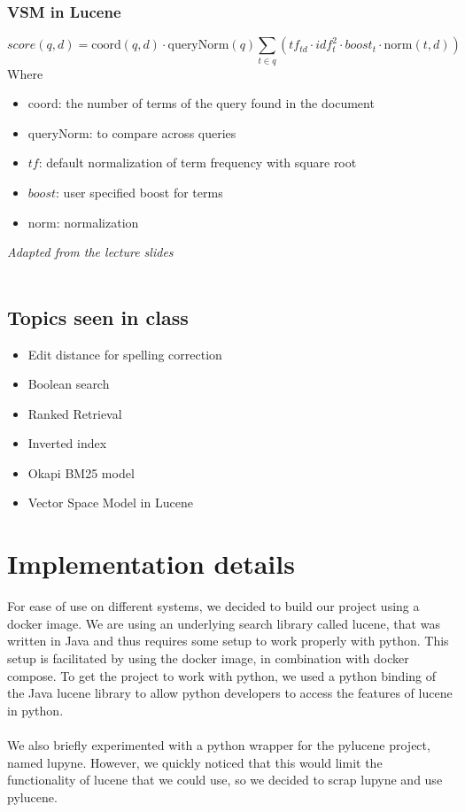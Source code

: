 \documentclass{article}
\begin{document}
\subsubsection{VSM in Lucene}
$$score(q,d) = \text{coord}(q,d) \cdot \text{queryNorm}(q) \displaystyle \sum_{t\in q}\left(tf_{td} \cdot idf_t^2 \cdot boost_t \cdot \text{norm}(t,d)\right)$$
Where \begin{itemize}
    \item coord: the number of terms of the query found in the document
    \item queryNorm: to compare across queries
    \item $tf$: default normalization of term frequency with square root
    \item $boost$: user specified boost for terms
    \item norm: normalization
\end{itemize}
\small
\textit{Adapted from the lecture slides}\\~\\
\normalsize

\subsection{Topics seen in class}
\begin{itemize}
    \item Edit distance for spelling correction
    \item Boolean search
    \item Ranked Retrieval
    \item Inverted index %
    \item Okapi BM25 model
    \item Vector Space Model in Lucene
\end{itemize}

\section{Implementation details}
For ease of use on different systems, we decided to build our project
using a docker image. We are using an underlying search library called lucene,
that was written in Java and thus requires some setup to work properly with
python. This setup is facilitated by using the docker image,
in combination with docker compose.
To get the project to work with python, we used a python binding of the Java lucene
library to allow python developers to access the features of lucene in python.
\\~\\
We also briefly experimented with a python wrapper for the pylucene project, named lupyne.
However, we quickly noticed that this would limit the functionality of lucene
that we could use, so we decided to scrap lupyne and use pylucene.
\end{document}
